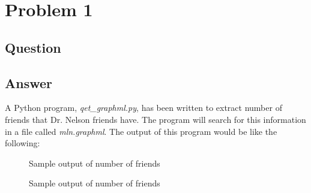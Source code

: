 \section{Problem 1}

\subsection{Question}
\vspace*{10pt}


\subsection{Answer}
\vspace{2mm}
A Python program, {\it qet\_graphml.py}, has been written to extract number of friends that Dr. Nelson friends have. The program will search for this information in a file called {\it mln.graphml}. The output of this program would be like the following:
\vspace{5mm}

\begin{figure}[h!]
\centering
{}
\caption{Sample output of number of friends}
\label{fig:number_friends_1}
\end{figure}
\vspace*{5pt}

\begin{figure}[h!]
\centering
{}
\caption{Sample output of number of friends}
\label{fig:number_friends_2}
\end{figure}
\clearpage
\newpage
\vspace*{5pt}



